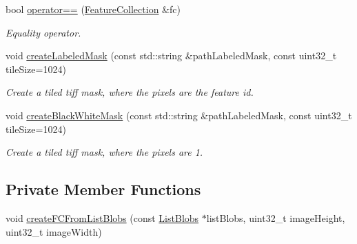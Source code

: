 \begin{DoxyCompactItemize}
bool \hyperlink{classfc_1_1FeatureCollection_a6286aca807e61dc6931beca4e4d1d145}{operator==} (\hyperlink{classfc_1_1FeatureCollection}{Feature\+Collection} \&fc)
\begin{DoxyCompactList}\small\item\em Equality operator. \end{DoxyCompactList}\item 
void \hyperlink{classfc_1_1FeatureCollection_a42a98939246d7ca645dafa6694b1aaa3}{create\+Labeled\+Mask} (const std\+::string \&path\+Labeled\+Mask, const uint32\+\_\+t tile\+Size=1024)
\begin{DoxyCompactList}\small\item\em Create a tiled tiff mask, where the pixels are the feature id. \end{DoxyCompactList}\item 
void \hyperlink{classfc_1_1FeatureCollection_a6a3df355558df392bbf54e8734975964}{create\+Black\+White\+Mask} (const std\+::string \&path\+Labeled\+Mask, const uint32\+\_\+t tile\+Size=1024)
\begin{DoxyCompactList}\small\item\em Create a tiled tiff mask, where the pixels are 1. \end{DoxyCompactList}\end{DoxyCompactItemize}
\subsection*{Private Member Functions}
\begin{DoxyCompactItemize}
\item 
void \hyperlink{classfc_1_1FeatureCollection_a6cb55ca9179ea92ef2dedf9f25531b77}{create\+F\+C\+From\+List\+Blobs} (const \hyperlink{structfc_1_1ListBlobs}{List\+Blobs} $\ast$list\+Blobs, uint32\+\_\+t image\+Height, uint32\+\_\+t image\+Width)
\end{DoxyCompactItemize}
